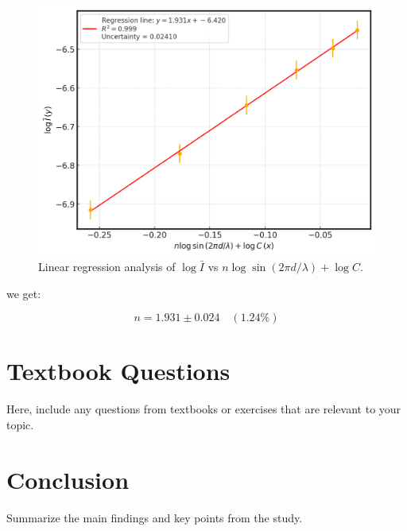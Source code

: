 \documentclass{article}
\begin{document}
\begin{figure}[H]
    \centering
    \includegraphics[width=\textwidth]{./media/lab1.png}
    \caption{Linear regression analysis of $\log \bar{I}$ vs $n \log \sin\left(2 \pi d / \lambda \right) + \log C$.}
    \label{fig:regression}
\end{figure}

we get:

\[
n = 1.931 \pm 0.024 \quad (1.24\%)
\]



\section{Textbook Questions}
Here, include any questions from textbooks or exercises that are relevant to your topic.

\section{Conclusion}
Summarize the main findings and key points from the study.

\printbibliography
\end{document}

